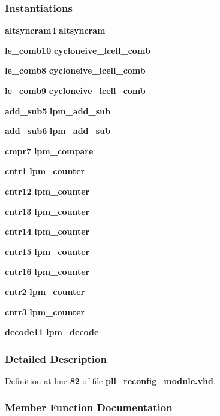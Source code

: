 \subsubsection*{Instantiations}
 \begin{DoxyCompactItemize}
\item 
{\bf altsyncram4}  {\bfseries altsyncram}   
\item 
{\bf le\+\_\+comb10}  {\bfseries cycloneive\+\_\+lcell\+\_\+comb}   
\item 
{\bf le\+\_\+comb8}  {\bfseries cycloneive\+\_\+lcell\+\_\+comb}   
\item 
{\bf le\+\_\+comb9}  {\bfseries cycloneive\+\_\+lcell\+\_\+comb}   
\item 
{\bf add\+\_\+sub5}  {\bfseries lpm\+\_\+add\+\_\+sub}   
\item 
{\bf add\+\_\+sub6}  {\bfseries lpm\+\_\+add\+\_\+sub}   
\item 
{\bf cmpr7}  {\bfseries lpm\+\_\+compare}   
\item 
{\bf cntr1}  {\bfseries lpm\+\_\+counter}   
\item 
{\bf cntr12}  {\bfseries lpm\+\_\+counter}   
\item 
{\bf cntr13}  {\bfseries lpm\+\_\+counter}   
\item 
{\bf cntr14}  {\bfseries lpm\+\_\+counter}   
\item 
{\bf cntr15}  {\bfseries lpm\+\_\+counter}   
\item 
{\bf cntr16}  {\bfseries lpm\+\_\+counter}   
\item 
{\bf cntr2}  {\bfseries lpm\+\_\+counter}   
\item 
{\bf cntr3}  {\bfseries lpm\+\_\+counter}   
\item 
{\bf decode11}  {\bfseries lpm\+\_\+decode}   
\end{DoxyCompactItemize}


\subsubsection{Detailed Description}


Definition at line {\bf 82} of file {\bf pll\+\_\+reconfig\+\_\+module.\+vhd}.



\subsubsection{Member Function Documentation}
